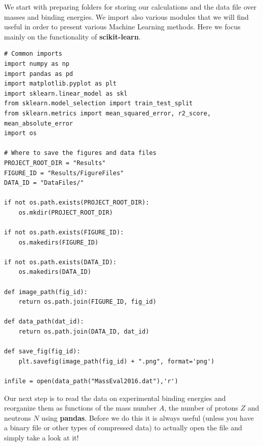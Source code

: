 \documentclass[%
oneside,                 %
final,                   %
10pt]{article}
\begin{document}
We start with preparing folders for storing our calculations and the data file over masses and binding energies. We import also various modules that we will find useful in order to present various Machine Learning methods. Here we focus mainly on the functionality of \textbf{scikit-learn}.
\begin{verbatim}
# Common imports
import numpy as np
import pandas as pd
import matplotlib.pyplot as plt
import sklearn.linear_model as skl
from sklearn.model_selection import train_test_split
from sklearn.metrics import mean_squared_error, r2_score, mean_absolute_error
import os

# Where to save the figures and data files
PROJECT_ROOT_DIR = "Results"
FIGURE_ID = "Results/FigureFiles"
DATA_ID = "DataFiles/"

if not os.path.exists(PROJECT_ROOT_DIR):
    os.mkdir(PROJECT_ROOT_DIR)

if not os.path.exists(FIGURE_ID):
    os.makedirs(FIGURE_ID)

if not os.path.exists(DATA_ID):
    os.makedirs(DATA_ID)

def image_path(fig_id):
    return os.path.join(FIGURE_ID, fig_id)

def data_path(dat_id):
    return os.path.join(DATA_ID, dat_id)

def save_fig(fig_id):
    plt.savefig(image_path(fig_id) + ".png", format='png')

infile = open(data_path("MassEval2016.dat"),'r')
\end{verbatim}



Our next step is to read the data on experimental binding energies and
reorganize them as functions of the mass number $A$, the number of
protons $Z$ and neutrons $N$ using \textbf{pandas}.  Before we do this it is
always useful (unless you have a binary file or other types of compressed
data) to actually open the file and simply take a look at it!
\end{document}
